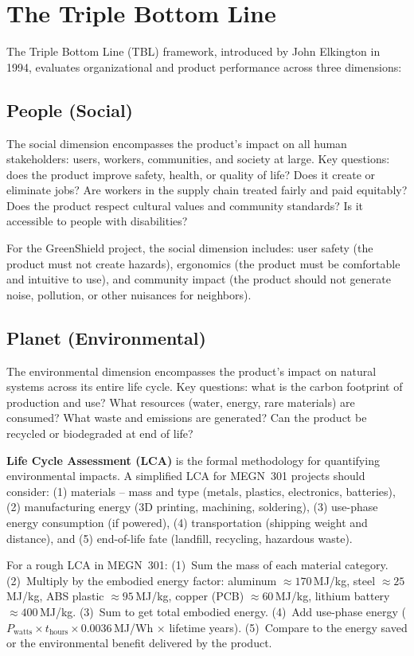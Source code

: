 \section{The Triple Bottom Line}
The Triple Bottom Line (TBL) framework, introduced by John Elkington in 1994, evaluates organizational and product performance across three dimensions:

\subsection{People (Social)}
The social dimension encompasses the product's impact on all human stakeholders: users, workers, communities, and society at large. Key questions: does the product improve safety, health, or quality of life? Does it create or eliminate jobs? Are workers in the supply chain treated fairly and paid equitably? Does the product respect cultural values and community standards? Is it accessible to people with disabilities?

For the GreenShield project, the social dimension includes: user safety (the product must not create hazards), ergonomics (the product must be comfortable and intuitive to use), and community impact (the product should not generate noise, pollution, or other nuisances for neighbors).

\subsection{Planet (Environmental)}
The environmental dimension encompasses the product's impact on natural systems across its entire life cycle. Key questions: what is the carbon footprint of production and use? What resources (water, energy, rare materials) are consumed? What waste and emissions are generated? Can the product be recycled or biodegraded at end of life?

\textbf{Life Cycle Assessment (LCA)} is the formal methodology for quantifying environmental impacts. A simplified LCA for MEGN~301 projects should consider: (1) materials -- mass and type (metals, plastics, electronics, batteries), (2) manufacturing energy (3D printing, machining, soldering), (3) use-phase energy consumption (if powered), (4) transportation (shipping weight and distance), and (5) end-of-life fate (landfill, recycling, hazardous waste).

\begin{tipbox}
For a rough LCA in MEGN~301: (1)~Sum the mass of each material category. (2)~Multiply by the embodied energy factor: aluminum $\approx 170$\,MJ/kg, steel $\approx 25$\,MJ/kg, ABS plastic $\approx 95$\,MJ/kg, copper (PCB) $\approx 60$\,MJ/kg, lithium battery $\approx 400$\,MJ/kg. (3)~Sum to get total embodied energy. (4)~Add use-phase energy ($P_{\text{watts}} \times t_{\text{hours}} \times 0.0036$\,MJ/Wh $\times$ lifetime years). (5)~Compare to the energy saved or the environmental benefit delivered by the product.
\end{tipbox}

